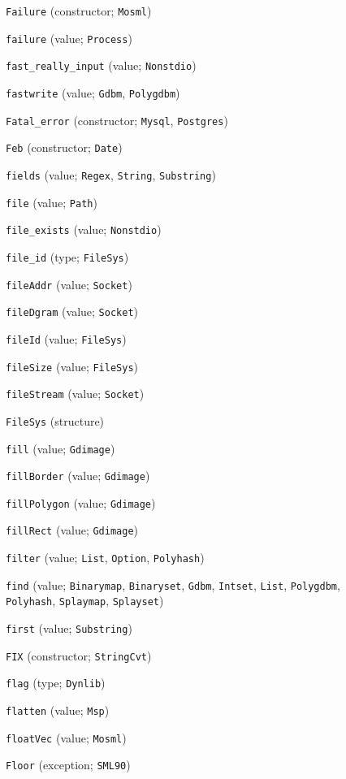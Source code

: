 \begin{description}
\item[] \verb"Failure" (constructor; \verb"Mosml")
\item[] \verb"failure" (value; \verb"Process")
\item[] \verb"fast_really_input" (value; \verb"Nonstdio")
\item[] \verb"fastwrite" (value; \verb"Gdbm", \verb"Polygdbm")
\item[] \verb"Fatal_error" (constructor; \verb"Mysql", \verb"Postgres")
\item[] \verb"Feb" (constructor; \verb"Date")
\item[] \verb"fields" (value; \verb"Regex", \verb"String", \verb"Substring")
\item[] \verb"file" (value; \verb"Path")
\item[] \verb"file_exists" (value; \verb"Nonstdio")
\item[] \verb"file_id" (type; \verb"FileSys")
\item[] \verb"fileAddr" (value; \verb"Socket")
\item[] \verb"fileDgram" (value; \verb"Socket")
\item[] \verb"fileId" (value; \verb"FileSys")
\item[] \verb"fileSize" (value; \verb"FileSys")
\item[] \verb"fileStream" (value; \verb"Socket")
\item[] \verb"FileSys" (structure)
\item[] \verb"fill" (value; \verb"Gdimage")
\item[] \verb"fillBorder" (value; \verb"Gdimage")
\item[] \verb"fillPolygon" (value; \verb"Gdimage")
\item[] \verb"fillRect" (value; \verb"Gdimage")
\item[] \verb"filter" (value; \verb"List", \verb"Option", \verb"Polyhash")
\item[] \verb"find" (value; \verb"Binarymap", \verb"Binaryset", \verb"Gdbm", \verb"Intset", \verb"List", \verb"Polygdbm", \verb"Polyhash", \verb"Splaymap", \verb"Splayset")
\item[] \verb"first" (value; \verb"Substring")
\item[] \verb"FIX" (constructor; \verb"StringCvt")
\item[] \verb"flag" (type; \verb"Dynlib")
\item[] \verb"flatten" (value; \verb"Msp")
\item[] \verb"floatVec" (value; \verb"Mosml")
\item[] \verb"Floor" (exception; \verb"SML90")

\end{description}
